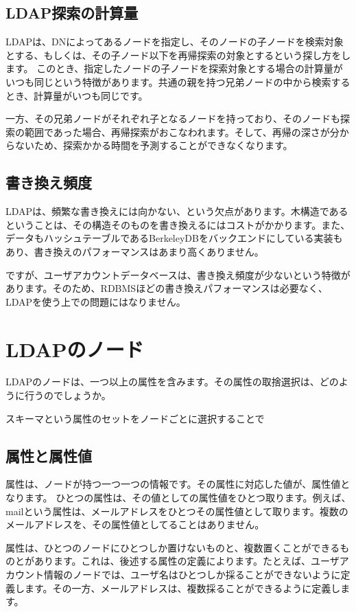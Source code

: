 \subsection{LDAP探索の計算量}

LDAPは、DNによってあるノードを指定し、そのノードの子ノードを検索対象とする、もしくは、その子ノード以下を再帰探索の対象とするという探し方をします。
このとき、指定したノードの子ノードを探索対象とする場合の計算量がいつも同じという特徴があります。共通の親を持つ兄弟ノードの中から検索するとき、計算量がいつも同じです。

一方、その兄弟ノードがそれぞれ子となるノードを持っており、そのノードも探索の範囲であった場合、再帰探索がおこなわれます。そして、再帰の深さが分からないため、探索かかる時間を予測することができなくなります。

\subsection{書き換え頻度}

LDAPは、頻繁な書き換えには向かない、という欠点があります。木構造であるということは、その構造そのものを書き換えるにはコストがかかります。また、データもハッシュテーブルであるBerkeleyDBをバックエンドにしている実装もあり、書き換えのパフォーマンスはあまり高くありません。

ですが、ユーザアカウントデータベースは、書き換え頻度が少ないという特徴があります。そのため、RDBMSほどの書き換えパフォーマンスは必要なく、LDAPを使う上での問題にはなりません。

\section{LDAPのノード}

LDAPのノードは、一つ以上の属性を含みます。その属性の取捨選択は、どのように行うのでしょうか。

スキーマという属性のセットをノードごとに選択することで

\subsection{属性と属性値}

属性は、ノードが持つ一つ一つの情報です。その属性に対応した値が、属性値となります。
ひとつの属性は、その値としての属性値をひとつ取ります。例えば、mailという属性は、メールアドレスをひとつその属性値として取ります。複数のメールアドレスを、その属性値としてることはありません。

属性は、ひとつのノードにひとつしか置けないものと、複数置くことができるものとがあります。これは、後述する属性の定義によります。たとえば、ユーザアカウント情報のノードでは、ユーザ名はひとつしか採ることができないように定義します。その一方、メールアドレスは、複数採ることができるように定義します。

